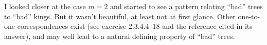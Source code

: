 I looked closer at the case $m=2$ and started to see a pattern relating ``bad''
trees to ``bad'' kings. But it wasn't beautiful, at least not at first glance.
Other one-to-one correspondences
 exist (see exercise 2.3.4.4--18 and the reference
cited in its answer), and may well lead to a natural defining property of
 ``bad'' trees.

\bye
